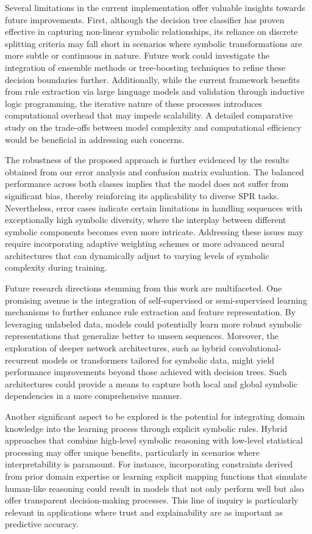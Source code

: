 \documentclass{article}
\begin{document}
Several limitations in the current implementation offer valuable insights towards future improvements. First, although the decision tree classifier has proven effective in capturing non-linear symbolic relationships, its reliance on discrete splitting criteria may fall short in scenarios where symbolic transformations are more subtle or continuous in nature. Future work could investigate the integration of ensemble methods or tree-boosting techniques to refine these decision boundaries further. Additionally, while the current framework benefits from rule extraction via large language models and validation through inductive logic programming, the iterative nature of these processes introduces computational overhead that may impede scalability. A detailed comparative study on the trade-offs between model complexity and computational efficiency would be beneficial in addressing such concerns.

The robustness of the proposed approach is further evidenced by the results obtained from our error analysis and confusion matrix evaluation. The balanced performance across both classes implies that the model does not suffer from significant bias, thereby reinforcing its applicability to diverse SPR tasks. Nevertheless, error cases indicate certain limitations in handling sequences with exceptionally high symbolic diversity, where the interplay between different symbolic components becomes even more intricate. Addressing these issues may require incorporating adaptive weighting schemes or more advanced neural architectures that can dynamically adjust to varying levels of symbolic complexity during training.

Future research directions stemming from this work are multifaceted. One promising avenue is the integration of self-supervised or semi-supervised learning mechanisms to further enhance rule extraction and feature representation. By leveraging unlabeled data, models could potentially learn more robust symbolic representations that generalize better to unseen sequences. Moreover, the exploration of deeper network architectures, such as hybrid convolutional-recurrent models or transformers tailored for symbolic data, might yield performance improvements beyond those achieved with decision trees. Such architectures could provide a means to capture both local and global symbolic dependencies in a more comprehensive manner.

Another significant aspect to be explored is the potential for integrating domain knowledge into the learning process through explicit symbolic rules. Hybrid approaches that combine high-level symbolic reasoning with low-level statistical processing may offer unique benefits, particularly in scenarios where interpretability is paramount. For instance, incorporating constraints derived from prior domain expertise or learning explicit mapping functions that simulate human-like reasoning could result in models that not only perform well but also offer transparent decision-making processes. This line of inquiry is particularly relevant in applications where trust and explainability are as important as predictive accuracy.
\end{document}
